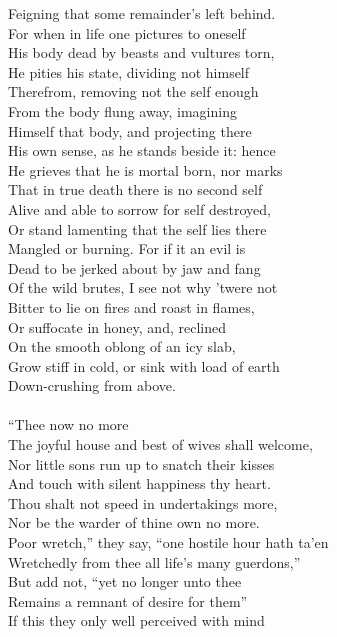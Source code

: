 Feigning that some remainder's left behind.\\
For when in life one pictures to oneself\\
His body dead by beasts and vultures torn,\\
He pities his state, dividing not himself\\
Therefrom, removing not the self enough\\
From the body flung away, imagining\\
Himself that body, and projecting there\\
His own sense, as he stands beside it: hence\\
He grieves that he is mortal born, nor marks\\
That in true death there is no second self\\
Alive and able to sorrow for self destroyed,\\
Or stand lamenting that the self lies there\\
Mangled or burning. For if it an evil is\\
Dead to be jerked about by jaw and fang\\
Of the wild brutes, I see not why 'twere not\\
Bitter to lie on fires and roast in flames,\\
Or suffocate in honey, and, reclined\\
On the smooth oblong of an icy slab,\\
Grow stiff in cold, or sink with load of earth\\
Down-crushing from above.\\
\\
``Thee now no more\\
The joyful house and best of wives shall welcome,\\
Nor little sons run up to snatch their kisses\\
And touch with silent happiness thy heart.\\
Thou shalt not speed in undertakings more,\\
Nor be the warder of thine own no more.\\
Poor wretch,'' they say, ``one hostile hour hath ta'en\\
Wretchedly from thee all life's many guerdons,''\\
But add not, ``yet no longer unto thee\\
Remains a remnant of desire for them''\\
If this they only well perceived with mind\\

